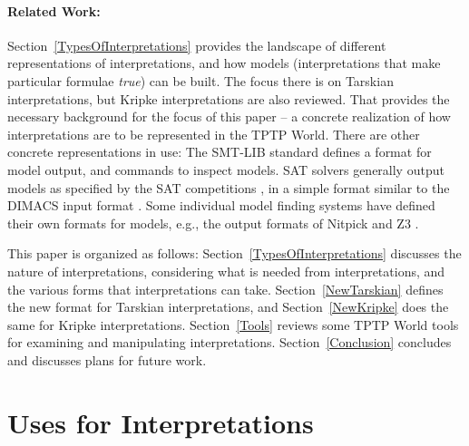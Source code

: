 \documentclass{easychair}
\begin{document}
\paragraph{Related Work:}
Section~\ref{TypesOfInterpretations} provides the landscape of different representations of
interpretations, and how models (interpretations that make particular formulae {\em true})
can be built.
The focus there is on Tarskian interpretations, but Kripke interpretations are also reviewed.
That provides the necessary background for the focus of this paper -- a concrete realization
of how interpretations are to be represented in the TPTP World.
There are other concrete representations in use:
The SMT-LIB standard \cite{BFT17} defines a format for model output, and commands to inspect 
models.  
SAT solvers generally output models as specified by the SAT competitions \cite{JL+12}, in a 
simple format similar to the DIMACS input format \cite{Bab93}.
Some individual model finding systems have defined their own formats for models, e.g., the 
output formats of Nitpick and Z3 \cite{dMB08}.

This paper is organized as follows:
Section~\ref{TypesOfInterpretations} discusses the nature of interpretations, considering what is
needed from interpretations, and the various forms that interpretations can take.
Section~\ref{NewTarskian} defines the new format for Tarskian interpretations, and
Section~\ref{NewKripke} does the same for Kripke interpretations.
Section~\ref{Tools} reviews some TPTP World tools for examining and manipulating interpretations.
Section~\ref{Conclusion} concludes and discusses plans for future work.

\section{Uses for Interpretations}
\label{UsesForInterpretations}
\end{document}
